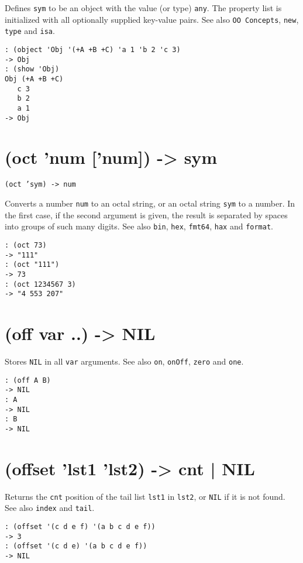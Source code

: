 {{{{{{{Defines \texttt{sym} to be an object with the value (or type) \texttt{any}. The
property list is initialized with all optionally supplied key-value
pairs. See also \texttt{OO Concepts}, \texttt{new}, \texttt{type} and \texttt{isa}.


\begin{verbatim}
: (object 'Obj '(+A +B +C) 'a 1 'b 2 'c 3)
-> Obj
: (show 'Obj)
Obj (+A +B +C)
   c 3
   b 2
   a 1
-> Obj
\end{verbatim}

 
\section{(oct 'num ['num]) -> sym}
\label{sec-8-1-15-5}


\texttt{(oct 'sym) -> num}

Converts a number \texttt{num} to an octal string, or an octal string \texttt{sym} to
a number. In the first case, if the second argument is given, the result
is separated by spaces into groups of such many digits. See also \texttt{bin},
\texttt{hex}, \texttt{fmt64}, \texttt{hax} and \texttt{format}.


\begin{verbatim}
: (oct 73)
-> "111"
: (oct "111")
-> 73
: (oct 1234567 3)
-> "4 553 207"
\end{verbatim}

 
\section{(off var ..) -> NIL}
\label{sec-8-1-15-6}


Stores \texttt{NIL} in all \texttt{var} arguments. See also \texttt{on}, \texttt{onOff}, \texttt{zero} and
\texttt{one}.


\begin{verbatim}
: (off A B)
-> NIL
: A
-> NIL
: B
-> NIL
\end{verbatim}

 
\section{(offset 'lst1 'lst2) -> cnt | NIL}
\label{sec-8-1-15-7}


Returns the \texttt{cnt} position of the tail list \texttt{lst1} in \texttt{lst2}, or \texttt{NIL}
if it is not found. See also \texttt{index} and \texttt{tail}.


\begin{verbatim}
: (offset '(c d e f) '(a b c d e f))
-> 3
: (offset '(c d e) '(a b c d e f))
-> NIL
\end{verbatim}

}}}}}}}
